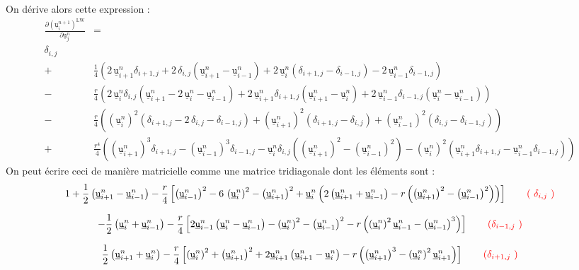 \documentclass[a4paper,12pt]{article}
\newcommand{\bepar}[1]{
	\left( #1 \right)  
}
\newcommand{\becro}[1]{
	\left[ #1 \right]  
}
\newcommand{\uin}[2]{
	\underline{\texttt{u}}_{#1}^{#2}
}
\newcommand{\ui}[1]{
	\underline{\texttt{u}}_{#1}^{n}
}
\newcommand{\dij}[1]{
	\delta_{#1,j}
}
\newcommand\red{\color{red}}
\numberwithin{equation}{section} %
\begin{document}
On dérive alors cette expression :
\begin{align*}
\frac{\partial \bepar{\uin{i}{n+1}}^\text{LW}}{\partial \ui{j} } &= \\
 \dij{i} \\
+\ & \frac{1}{4} \bepar{2\, \ui{i+1} \dij{i+1} + 2\, \dij{i}\bepar{\ui{i+1} - \ui{i-1}} + 2\, \ui{i}\bepar{\dij{i+1}- \dij{i-1}} - 2\, \ui{i-1} \dij{i-1}} \\
-\ & \frac{r}{4} \bepar{ 2\, \ui{i}\dij{i} \bepar{\ui{i+1} - 2\, \ui{i} - \ui{i-1} } + 2\, \ui{i+1}\dij{i+1} \bepar{\ui{i+1} - \ui{i}} + 2\, \ui{i-1}\dij{i-1} \bepar{\ui{i} - \ui{i-1}}} \\
-\ & \frac{r}{4} \bepar{\bepar{\ui{i}}^2\bepar{\dij{i+1} -2\, \dij{i} - \dij{i-1}} + \bepar{\ui{i+1}}^2\bepar{\dij{i+1} - \dij{i}} + \bepar{\ui{i-1}}^2\bepar{\dij{i} - \dij{i-1}}} \\
+\ & \frac{r^4}{4}\bepar{\bepar{\ui{i+1}}^3 \dij{i+1} -\bepar{\ui{i-1}}^3\dij{i-1} -\ui{i}\dij{i}\bepar{\bepar{\ui{i+1}}^2 - \bepar{\ui{i-1}}^2}- \bepar{\ui{i}}^2\bepar{\ui{i+1}\dij{i+1} - \ui{i-1}\dij{i-1}} }
\end{align*}
On peut écrire ceci de manière matricielle comme une matrice tridiagonale dont les éléments sont :
\begin{equation} 
 1 + \frac{1}{2}\bepar{\ui{i+1} - \ui{i-1}} - \frac{r}{4} \becro{\bepar{\ui{i-1}}^2 - 6\,\bepar{\ui{i}}^2 - \bepar{\ui{i+1}}^2 + \ui{i} \bepar{2\bepar{\ui{i+1} + \ui{i-1}} - r \bepar{\bepar{\ui{i+1}} ^2 - \bepar{\ui{i-1}} ^2 }}} 
 \red \tag{ $\dij{i}$ }
 \end{equation} 
 
 \begin{equation} 
 -\frac{1}{2}\bepar{\ui{i}+\ui{i-1}} - \frac{r}{4} \becro{2\ui{i-1}\bepar{\ui{i} - \ui{i-1}} -\bepar{\ui{i}}^2 -\bepar{\ui{i-1}}^2 - r\bepar{\bepar{\ui{i}}^2\ui{i-1} - \bepar{\ui{i-1}}^3 }}
 \red \tag{$\dij{i-1}$ }
 \end{equation}
 
 \begin{equation}
 \frac{1}{2}\bepar{\ui{i+1} + \ui{i}} - \frac{r}{4} \becro{\bepar{\ui{i}}^2 + \bepar{\ui{i+1}}^2 + 2\ui{i+1}\bepar{\ui{i+1} - \ui{i}} - r\bepar{\bepar{\ui{i+1}}^3 - \bepar{\ui{i}}^2\ui{i+1}}}
 \red \tag{$\dij{i+1}$ }
 \end{equation}
 
\end{document}
